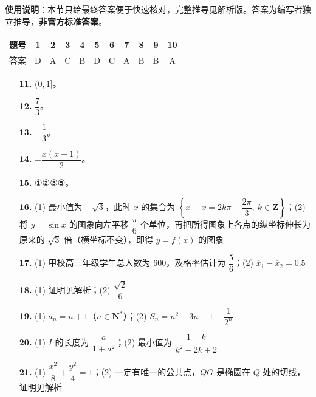 
\begin{gknotice}
\textbf{使用说明}：本节只给最终答案便于快速核对，完整推导见解析版。答案为编写者独立推导，\textbf{非官方标准答案}。
\end{gknotice}

\begin{center}\begin{tabular}{ccccccccccc}
\toprule
题号 & 1 & 2 & 3 & 4 & 5 & 6 & 7 & 8 & 9 & 10 \\
\midrule
答案 & D & A & C & B & D & C & A & B & B & A \\
\bottomrule
\end{tabular}\end{center}

\begin{itemize}[leftmargin=2.6em]
  \item[\textbf{11.}] $(0,1]$。
  \item[\textbf{12.}] $\dfrac73$。
  \item[\textbf{13.}] $-\dfrac13$。
  \item[\textbf{14.}] $-\dfrac{x(x+1)}2$。
  \item[\textbf{15.}] ①②③⑤。
\end{itemize}

\begin{itemize}[leftmargin=2.6em]
  \item[\textbf{16.}] (1) 最小值为 $-\sqrt3$，此时 $x$ 的集合为 $\left\{x\ \middle|\ x=2k\pi-\dfrac{2\pi}3,\ k\in\mathbf Z\right\}$；(2) 将 $y=\sin x$ 的图象向左平移 $\dfrac\pi6$ 个单位，再把所得图象上各点的纵坐标伸长为原来的 $\sqrt3$ 倍（横坐标不变），即得 $y=f(x)$ 的图象
  \item[\textbf{17.}] (1) 甲校高三年级学生总人数为 $600$，及格率估计为 $\dfrac56$；(2) $\overline{x}_1-\overline{x}_2=0.5$
  \item[\textbf{18.}] (1) 证明见解析；(2) $\dfrac{\sqrt2}6$
  \item[\textbf{19.}] (1) $a_n=n+1$（$n\in\mathbf N^*$）；(2) $S_n=n^2+3n+1-\dfrac1{2^n}$
  \item[\textbf{20.}] (1) $I$ 的长度为 $\dfrac a{1+a^2}$；(2) 最小值为 $\dfrac{1-k}{k^2-2k+2}$
  \item[\textbf{21.}] (1) $\dfrac{x^2}8+\dfrac{y^2}4=1$；(2) 一定有唯一的公共点，$QG$ 是椭圆在 $Q$ 处的切线，证明见解析
\end{itemize}
